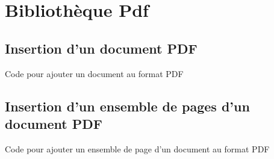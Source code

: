 \chapter{Bibliothèque Pdf}

\section{Insertion d'un document PDF}

\begin{Latex}{Code pour ajouter un document au format PDF}
    
\end{Latex}

\section{Insertion d'un ensemble de pages d'un document PDF}

\begin{Latex}{Code pour ajouter un ensemble de page d'un document au format PDF}
    
\end{Latex}